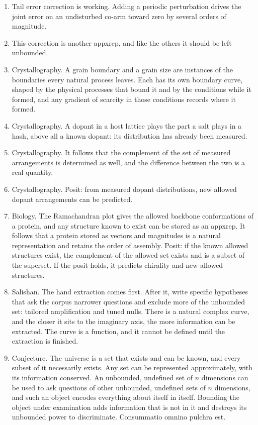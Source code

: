 \begin{enumerate}
\item Tail error correction is working. Adding a periodic perturbation drives the joint error on an
undisturbed co-arm toward zero by several orders of magnitude.

\item This correction is another appxrep, and like the others it should be left unbounded.

\item Crystallography. A grain boundary and a grain size are instances of the boundaries every natural
process leaves. Each has its own boundary curve, shaped by the physical processes that bound it and by
the conditions while it formed, and any gradient of scarcity in those conditions records where it
formed.

\item Crystallography. A dopant in a host lattice plays the part a salt plays in a hash, above all a
known dopant: its distribution has already been measured.

\item Crystallography. It follows that the complement of the set of measured arrangements is
determined as well, and the difference between the two is a real quantity.

\item Crystallography. Posit: from measured dopant distributions, new allowed dopant arrangements can
be predicted.

\item Biology. The Ramachandran plot gives the allowed backbone conformations of a protein, and any
structure known to exist can be stored as an appxrep. It follows that a protein stored as vectors and
magnitudes is a natural representation and retains the order of assembly. Posit: if the known allowed
structures exist, the complement of the allowed set exists and is a subset of the superset. If the
posit holds, it predicts chirality and new allowed structures.

\item Salishan. The hand extraction comes first. After it, write specific hypotheses that ask the
corpus narrower questions and exclude more of the unbounded set: tailored amplification and tuned
nulls. There is a natural complex curve, and the closer it sits to the imaginary axis, the more
information can be extracted. The curve is a function, and it cannot be defined until the extraction is
finished.

\item Conjecture. The universe is a set that exists and can be known, and every subset of it
necessarily exists. Any set can be represented approximately, with its information conserved. An
unbounded, undefined set of $n$ dimensions can be used to ask questions of other unbounded, undefined
sets of $n$ dimensions, and such an object encodes everything about itself in itself. Bounding the
object under examination adds information that is not in it and destroys its unbounded power to
discriminate. Consummatio omnino pulchra est.


\end{enumerate}
